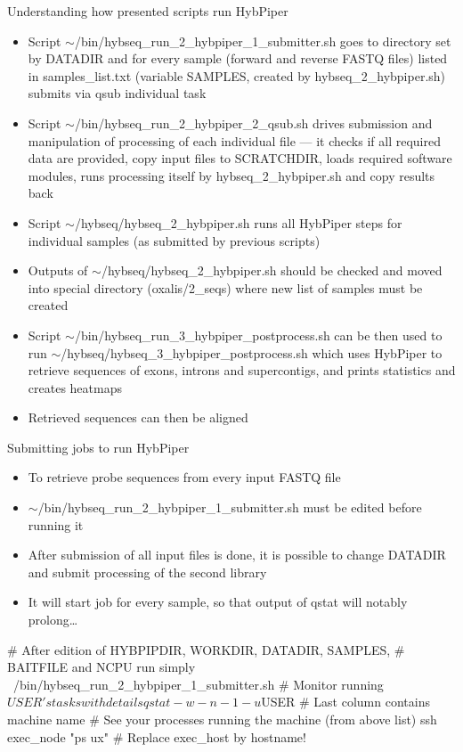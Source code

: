 \documentclass[compress, ucs, xelatex, 11pt, xcolor=x11names, aspectratio=169,
	hyperref={
		bookmarks=true,
		unicode=true,
		colorlinks=true,
		pdftitle={HybSeq course},
		plainpages=false,
		pdfauthor={Vojtech Zeisek},
		pdfsubject={Practical processing of HybSeq target enrichment sequencing data on computing grids like MetaCentrum},
		pdfcreator={XeLaTeX},
		pdfkeywords={BASH, command line, GNU, HybSeq, Linux, MetaCentrum, sequencing shell, target enrichment},
		linkcolor=Turquoise4, %
		anchorcolor=DodgerBlue4, %
		citecolor=DodgerBlue4, %
		filecolor=DodgerBlue4, %
		menucolor=Tan4, %
		urlcolor=DarkOliveGreen4, %
		pdftex},
	url={hyphens, lowtilde} %
	]{beamer}
\renewcommand{\texttt}[1]{\colorbox{Cornsilk2}{{\ttfamily #1}}}
\renewcommand{\alert}[1]{\textcolor{OrangeRed3}{#1}}
\begin{document}
\begin{frame}[allowframebreaks]{Understanding how presented scripts run HybPiper}
	\begin{itemize}
		\item Script \texttt{$\sim$/bin/hybseq\_run\_2\_hybpiper\_1\_submitter.sh} goes to directory set by \texttt{DATADIR} and for every sample (forward and reverse FASTQ files) listed in \texttt{samples\_list.txt} (variable \texttt{SAMPLES}, created by \texttt{hybseq\_2\_hybpiper.sh}) submits via \texttt{qsub} individual task
		\item Script \texttt{$\sim$/bin/hybseq\_run\_2\_hybpiper\_2\_qsub.sh} drives submission and manipulation of processing of each individual file --- it checks if all required data are provided, copy input files to \texttt{SCRATCHDIR}, loads required software modules, runs processing itself by \texttt{hybseq\_2\_hybpiper.sh} and copy results back
		\item Script \texttt{$\sim$/hybseq/hybseq\_2\_hybpiper.sh} runs all HybPiper steps for individual samples (as submitted by previous scripts)
		\item Outputs of \texttt{$\sim$/hybseq/hybseq\_2\_hybpiper.sh} should be checked and moved into special directory (\texttt{oxalis/2\_seqs}) where new list of samples must be created
		\item Script \texttt{$\sim$/bin/hybseq\_run\_3\_hybpiper\_postprocess.sh} can be then used to run \texttt{$\sim$/hybseq/hybseq\_3\_hybpiper\_postprocess.sh} which uses HybPiper to retrieve sequences of exons, introns and supercontigs, and prints statistics and creates heatmaps
		\item Retrieved sequences can then be aligned
	\end{itemize}
\end{frame}

\begin{frame}[fragile]{Submitting jobs to run HybPiper}
	\begin{itemize}
		\item To retrieve probe sequences from every input FASTQ file
		\item \alert{\texttt{$\sim$/bin/hybseq\_run\_2\_hybpiper\_1\_submitter.sh} must be edited before running it}
		\item After submission of all input files is done, it is possible to change \texttt{DATADIR} and submit processing of the second library
		\item It will start job for every sample, so that output of \texttt{qstat} will notably prolong\ldots
	\end{itemize}
	\begin{bashcode}
    # After edition of HYBPIPDIR, WORKDIR, DATADIR, SAMPLES,
    # BAITFILE and NCPU run simply
    ~/bin/hybseq_run_2_hybpiper_1_submitter.sh
    # Monitor running $USER's tasks with details
    qstat -w -n -1 -u $USER # Last column contains machine name
    # See your processes running the machine (from above list)
    ssh exec_node "ps ux" # Replace exec_host by hostname!
	\end{bashcode}
\end{frame}
\end{document}
